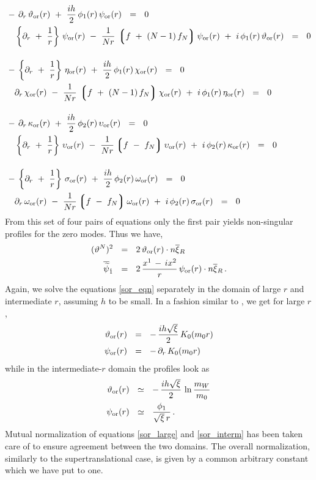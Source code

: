 \documentclass[12pt]{article}
\newcommand{\p}{\partial}
\newcommand{\wt}{\widetilde}
\newcommand{\ov}{\overline}
\newcommand{\lgr}{\left\lgroup}
\newcommand{\rgr}{\right\rgroup}
\newcommand{\bxir}{\ov{\xi}{}_R}
\newcommand{\tor}{\vartheta_{\rm or}}
\newcommand{\eor}{\eta_{\rm or}}
\newcommand{\kor}{\kappa_{\rm or}}
\newcommand{\sor}{\sigma_{\rm or}}
\newcommand{\por}{\psi_{\rm or}}
\newcommand{\cor}{\chi_{\rm or}}
\newcommand{\uor}{\upsilon_{\rm or}}
\newcommand{\oor}{\omega_{\rm or}}
\begin{document}
\begin{align}
\label{sor_eqn}
%
\notag
	&
	-\, \p_r\, \tor(r) ~+~ \frac{ih}{2}\, \phi_1(r)\,\por(r) ~~=~~ 0  \\
\notag
	&
	\phantom{-\,}
	\left\{ \p_r ~+~ \frac{1}{r} \right\}\, \por(r)  
			~-~ \frac{1}{Nr}\, \lgr f ~+~ (N-1)\,f_N \rgr \por(r) 
			~+~ i\,\phi_1(r)\,\tor(r) ~~=~~ 0                 \\[4mm]
%
\notag
	& 
	-\, \left\{ \p_r ~+~ \frac{1}{r} \right\}\, \eor(r) 
			~+~ \frac{ih}{2}\, \phi_1(r)\,\cor(r) ~~=~~ 0 \\
	&
	\phantom{-\,}
	\p_r\, \cor(r) ~-~ \frac{1}{Nr}\, \lgr f ~+~ (N-1)\,f_N \rgr \cor(r) 
			~+~ i\, \phi_1(r)\, \eor(r) ~~=~~ 0 \\[4mm]
%
\notag
	&
	-\, \p_r\, \kor(r) ~+~ \frac{ih}{2}\, \phi_2(r)\, \uor(r) ~~=~~ 0 \\
\notag
	&
	\phantom{-\,}
	\left\{ \p_r ~+~ \frac{1}{r} \right\}\, \uor(r) 
			~-~ \frac{1}{Nr} \lgr f ~-~ f_N \rgr \uor(r) 
			~+~ i\,\phi_2(r)\, \kor(r) ~~=~~ 0 \\[4mm]
%
\notag
	&
	-\, \left\{ \p_r ~+~ \frac{1}{r} \right\}\, \sor(r) 
			~+~ \frac{ih}{2}\, \phi_2(r)\,\oor(r) ~~=~~ 0 \\
\notag
	&
	\phantom{-\,}
	\p_r\, \oor(r) ~-~ \frac{1}{Nr}\lgr f ~-~ f_N \rgr \oor(r) 
			~+~ i\,\phi_2(r)\,\sor(r) ~~=~~ 0
\end{align}
From this set of four pairs of equations only the first pair yields non-singular profiles
for the zero modes.
Thus we have, 
\begin{align}
%
\notag
	(\vartheta^N)^2  & ~~=~~ 2\,\tor(r)\cdot n\bxir \\
%
\label{or_anz}
	\ov{\wt{\psi}}{}_{\dot 1} & ~~=~~ 2\, \frac{x^1\,-\,ix^2}{r}\, \por(r)\cdot n\bxir \,.
\end{align}
Again, we solve the equations \eqref{sor_eqn} separately in the domain of large $ r $ and 
intermediate $ r $, assuming $ h $ to be small.
In a fashion similar to \cite{GSYmmodel,BSYhet}, we get for large $ r $, 
\begin{align}
\label{sor_large}
%
\notag
	\tor(r) & ~~=~~ -\, \frac{ih\sqrt{\xi}}{2}\, K_0(m_0 r) \\
%
	\por(r) & ~~=~~ -\, \p_r\, K_0(m_0 r) 
\end{align}
while in the intermediate-$r$ domain the profiles look as
\begin{align}
\label{sor_interm}
%
\notag
	\tor(r) & ~~\simeq~~ -\, \frac{ih\sqrt{\xi}}{2}\, \ln \frac{m_W}{m_0} \\
%
	\por(r) & ~~\simeq~~ \frac{\phi_1}{\sqrt{\xi}\, r}\,.
\end{align}
Mutual normalization of equations \eqref{sor_large} and \eqref{sor_interm} has been taken care of
to ensure agreement between the two domains. 
The overall normalization, similarly to the supertranslational case, is given by a common 
arbitrary constant which we have put to one.
\end{document}
